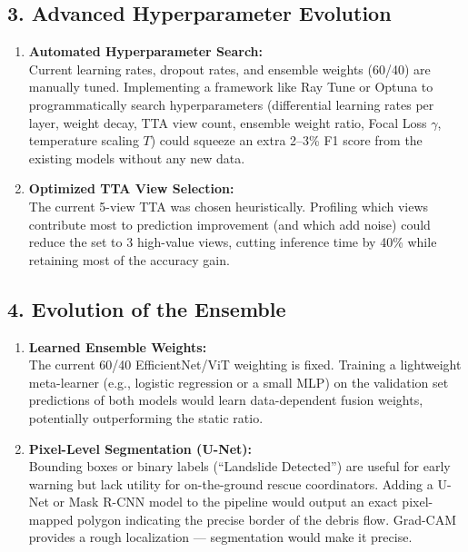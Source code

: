 \documentclass[11pt]{article}
\begin{document}
\subsection{3. Advanced Hyperparameter Evolution}
\begin{enumerate}
    \item \textbf{Automated Hyperparameter Search:}\\
          Current learning rates, dropout rates, and ensemble weights (60/40) are manually tuned. Implementing a framework like Ray Tune or Optuna to programmatically search hyperparameters (differential learning rates per layer, weight decay, TTA view count, ensemble weight ratio, Focal Loss $\gamma$, temperature scaling $T$) could squeeze an extra 2--3\% F1 score from the existing models without any new data.
    \item \textbf{Optimized TTA View Selection:}\\
          The current 5-view TTA was chosen heuristically. Profiling which views contribute most to prediction improvement (and which add noise) could reduce the set to 3 high-value views, cutting inference time by 40\% while retaining most of the accuracy gain.
\end{enumerate}

\subsection{4. Evolution of the Ensemble}
\begin{enumerate}
    \item \textbf{Learned Ensemble Weights:}\\
          The current 60/40 EfficientNet/ViT weighting is fixed. Training a lightweight meta-learner (e.g., logistic regression or a small MLP) on the validation set predictions of both models would learn data-dependent fusion weights, potentially outperforming the static ratio.
    \item \textbf{Pixel-Level Segmentation (U-Net):}\\
          Bounding boxes or binary labels (``Landslide Detected'') are useful for early warning but lack utility for on-the-ground rescue coordinators. Adding a U-Net or Mask R-CNN model to the pipeline would output an exact pixel-mapped polygon indicating the precise border of the debris flow. Grad-CAM provides a rough localization --- segmentation would make it precise.
\end{enumerate}
\end{document}
